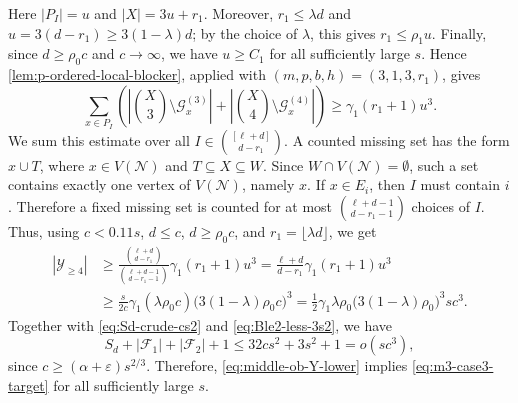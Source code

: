 \documentclass[10pt,a4paper]{article}
\numberwithin{equation}{section}
\theoremstyle{definition}
\newcommand{\F}{\mathcal F}
\newcommand{\G}{\mathcal G}
\newcommand{\Y}{\mathcal Y}
\begin{document}
Here $|P_I|=u$ and $|X|=3u+r_1$.
Moreover, $r_1\le\lambda d$ and $u=3(d-r_1)\ge3(1-\lambda)d$; by the choice of $\lambda$, this gives $r_1\le\rho_1u$.
Finally, since $d\ge\rho_0 c$ and $c\to\infty$, we have $u\ge C_1$ for all sufficiently large $s$.
Hence \cref{lem:p-ordered-local-blocker}, applied with $(m,p,b,h)=(3,1,3,r_1)$, gives
\[
        \sum_{x\in P_I}
        \left(
        \left|\binom X3\setminus\G_x^{(3)}\right|
        +
        \left|\binom X4\setminus\G_x^{(4)}\right|
        \right)
        \ge
        \gamma_1(r_1+1)u^3.
\]
We sum this estimate over all $I\in\binom{[\ell+d]}{d-r_1}$.
A counted missing set has the form $x\cup T$, where $x\in V(\mathcal N)$ and $T\subseteq X\subseteq W$.
Since $W\cap V(\mathcal N)=\emptyset$, such a set contains exactly one vertex of $V(\mathcal N)$, namely $x$.
If $x\in E_i$, then $I$ must contain $i$.
Therefore a fixed missing set is counted for at most $\binom{\ell+d-1}{d-r_1-1}$ choices of $I$.
Thus, using $c<0.11s$, $d\le c$, $d\ge\rho_0 c$, and $r_1=\lfloor\lambda d\rfloor$, we get
\begin{equation}\label{eq:middle-ob-Y-lower}
        \begin{aligned}
                |\Y_{\ge4}| & \ge
                \frac{\binom{\ell+d}{d-r_1}}{\binom{\ell+d-1}{d-r_1-1}}
                \gamma_1(r_1+1)u^3
                =
                \frac{\ell+d}{d-r_1}\gamma_1(r_1+1)u^3 \\
                            & \ge
                \frac{s}{2c}\gamma_1(\lambda\rho_0 c)
                \bigl(3(1-\lambda)\rho_0 c\bigr)^3
                =
                \frac12\gamma_1\lambda\rho_0
                \bigl(3(1-\lambda)\rho_0\bigr)^3sc^3.
        \end{aligned}
\end{equation}
Together with \eqref{eq:Sd-crude-cs2} and \eqref{eq:Ble2-less-3s2}, we have
\[
        S_d+|\F_1|+|\F_2|+1\le 32cs^2+3s^2+1=o(sc^3),
\]
since $c\ge(\alpha+\varepsilon)s^{2/3}$.
Therefore, \eqref{eq:middle-ob-Y-lower} implies \eqref{eq:m3-case3-target} for all sufficiently large $s$.

\medskip
\noindent{\bf Second branch: $\nu(\G_4)<q$.}
\medskip
\end{document}
